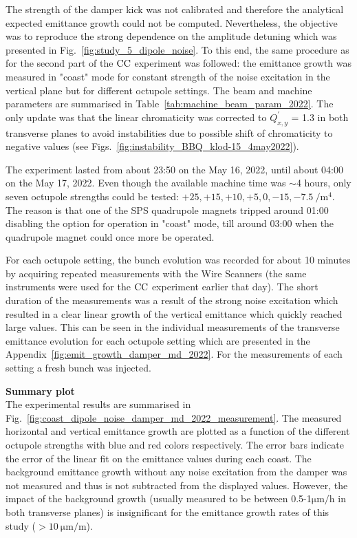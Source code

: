 The strength of the damper kick was not calibrated and therefore the analytical expected emittance growth could not be computed. Nevertheless, the objective was to reproduce the strong dependence on the amplitude detuning which was presented in Fig.~\ref{fig:study_5_dipole_noise}. To this end, the same procedure as for the second part of the ${\mathrm{CC}}$ experiment was followed: the emittance growth was measured in "coast" mode for constant strength of the noise excitation in the vertical plane but for different octupole settings. The beam and machine parameters are summarised in Table~\ref{tab:machine_beam_param_2022}. The only update was that the linear chromaticity was corrected to $Q^\prime_{x,y}$ = 1.3 in both transverse planes to avoid instabilities due to possible shift of chromaticity to negative values (see Figs.~\ref{fig:instability_BBQ_klod-15_4may2022}).%

The experiment lasted from about 23:50 on the May 16, 2022, until about 04:00 on the May 17, 2022. Even though the available machine time was $\sim$4 hours, only seven octupole strengths could be tested: $+25, +15, +10, +5, 0, -15, -7.5 \ \mathrm{/m^4}$. The reason is that one of the SPS quadrupole magnets tripped around 01:00 disabling the option for operation in "coast" mode, till around 03:00 when the quadrupole magnet could once more be operated.

For each octupole setting, the bunch evolution was recorded for about 10 minutes by acquiring repeated measurements with the Wire Scanners (the same instruments were used for the ${\mathrm{CC}}$ experiment earlier that day). The short duration of the measurements was a result of the strong noise excitation which resulted in a clear linear growth of the vertical emittance which quickly reached large values. This can be seen in the individual measurements of the transverse emittance evolution for each octupole setting which are presented in the Appendix~\ref{fig:emit_growth_damper_md_2022}. For the measurements of each setting a fresh bunch was injected. 

\textbf{Summary plot}\\
The experimental results are summarised in Fig.~\ref{fig:coast_dipole_noise_damper_md_2022_measurement}. The measured horizontal and vertical emittance growth are plotted as a function of the different octupole strengths with blue and red colors respectively. The error bars indicate the error of the linear fit on the emittance values during each coast. The background emittance growth without any noise excitation from the damper was not measured and thus is not subtracted from the displayed values. However, the impact of the background growth (usually measured to be between 0.5-1$\mathrm{\mu m/h}$ in both transverse planes) is insignificant for the emittance growth rates of this study ($ > 10 \ \mathrm{\mu m/m}$).
 


